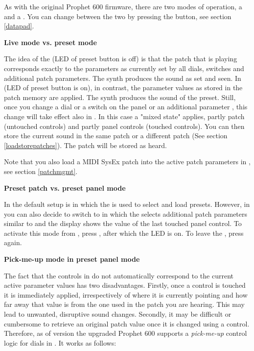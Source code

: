 As with the original Prophet 600 firmware, there are two modes of operation, a \presetmode and a \livemode. You can change between the two by pressing the \preset button, see section \ref{datapad}. 

\textbf{Live mode vs. preset mode}

The idea of the \livemode (LED of preset button is off) is that the patch that is playing corresponds exactly to the parameters as currently set by all dials, switches and additional patch parameters. The synth produces the sound as set and seen. In \presetmode (LED of preset button is on), in contrast, the parameter values as stored in the patch memory are applied. The synth produces the sound of the preset. Still, once you change a dial or a switch on the panel or an additional parameter , this change will take effect also in \presetmode. In this case a "mixed state" applies, partly patch (untouched controls) and partly panel controls (touched controls). You can then store the current sound in the same patch or a different patch (See section \ref{loadstorepatches}). The patch will be stored as heard. 

Note that you also load a MIDI SysEx patch into the active patch parameters in \presetmode, see section \ref{patchmgmt}.

\textbf{Preset patch vs. preset panel mode}

In \presetmode the default setup is \presetpatch in which the \termnumberpad is used to select and load presets. However, in \presetmode you can also decide to switch to \presetpanel in which the \termnumberpad selects additional patch parameters similar to \livemode and the display shows the value of the last touched panel control. To activate this mode from \presetpatch, press \totape, after which the LED is on. To leave the \presetpanel, press \totape again. 

\textbf{Pick-me-up mode in preset panel mode}

The fact that the controls in \presetmode do not automatically correspond to the current active parameter values has two disadvantages. Firstly, once a control is touched it is immediately applied, irrespectively of where it is currently pointing and how far away that value is from the one used in the patch you are hearing. This may lead to unwanted, disruptive sound changes. Secondly, it may be difficult or cumbersome to retrieve an original patch value once it is changed using a control. Therefore, as of version \version the upgraded Prophet 600 supports a \textit{pick-me-up} control logic for dials in \presetpanel. It works as follows:

